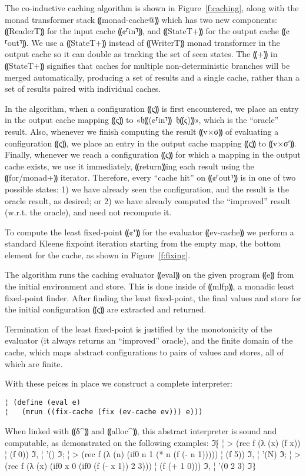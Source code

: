 The co-inductive caching algorithm is shown in Figure~\ref{f:caching}, along
with the monad transformer stack ⸨monad-cache@⸩ which has two new components:
⸨ReaderT⸩ for the input cache ⸨¢⸢in⸣⸩, and ⸨StateT+⸩ for the output cache
⸨¢⸢out⸣⸩. We use a ⸨StateT+⸩ instead of ⸨WriterT⸩ monad transformer in the
output cache so it can double as tracking the set of seen states. The ⸨+⸩ in
⸨StateT+⸩ signifies that caches for multiple non-deterministic branches will be
merged automatically, producing a set of results and a single cache, rather
than a set of results paired with individual caches.

In the algorithm, when a configuration ⸨ς⸩ is first encountered, we place an
entry in the output cache mapping ⸨ς⸩ to «𝔥⸨(¢⸢in⸣⸩\ 𝔥⸨ς)⸩», which is the
“oracle” result. Also, whenever we finish computing the result ⸨v×σ⸩ of
evaluating a configuration ⸨ς⸩, we place an entry in the output cache mapping
⸨ς⸩ to ⸨v×σ′⸩. Finally, whenever we reach a configuration ⸨ς⸩ for which a
mapping in the output cache exists, we use it immediately, ⸨return⸩ing each
result using the ⸨for/monad+⸩ iterator. Therefore, every “cache hit” on
⸨¢⸢out⸣⸩ is in one of two possible states: 1) we have already seen the
configuration, and the result is the oracle result, as desired; or 2) we have
already computed the “improved” result (w.r.t. the oracle), and need not
recompute it.

To compute the least fixed-point ⸨¢⁺⸩ for the evaluator ⸨ev-cache⸩ we perform a
standard Kleene fixpoint iteration starting from the empty map, the bottom
element for the cache, as shown in Figure~\ref{f:fixing}.

The algorithm runs the caching evaluator ⸨eval⸩ on the given program ⸨e⸩ from
the initial environment and store. This is done inside of ⸨mlfp⸩, a monadic
least fixed-point finder. After finding the least fixed-point, the final values
and store for the initial configuration ⸨ς⸩ are extracted and returned.

Termination of the least fixed-point is justified by the monotonicity of the
evaluator (it always returns an “improved” oracle), and the finite domain of
the cache, which maps abstract configurations to pairs of values and stores,
all of which are finite.

With these peices in place we construct a complete interpreter:
\begin{lstlisting}
¦ (define (eval e)
¦   (mrun ((fix-cache (fix (ev-cache ev))) e)))
\end{lstlisting}
When linked with ⸨δ^⸩ and ⸨alloc^⸩, this abstract interpreter is sound and
computable, as demonstrated on the following examples:
ℑ⁅
¦ > (rec f (λ (x) (f x))
¦     (f 0))
ℑ,
¦ '()
ℑ;
¦ > (rec f (λ (n) (if0 n 1 (* n (f (- n 1)))))
¦     (f 5))
ℑ,
¦ '(N)
ℑ;
¦ > (rec f (λ (x) (if0 x 0 (if0 (f (- x 1)) 2 3)))
¦      (f (+ 1 0)))
ℑ,
¦ '(0 2 3)
ℑ⁆

